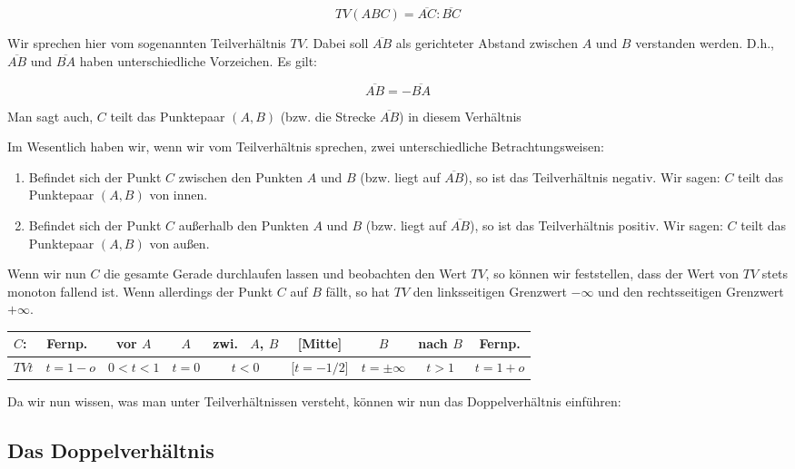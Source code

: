 \documentclass[12pt,a4paper]{article}
\begin{document}
\[TV(A B C) = \overline{A C} : \overline{B C}\]

Wir sprechen hier vom sogenannten Teilverhältnis $TV$. Dabei soll $\overline{A B}$ als gerichteter Abstand zwischen $A$ und $B$ verstanden werden. D.h., $\overline{A B}$ und $\overline{B A}$ haben unterschiedliche Vorzeichen. Es gilt: 

\[\overline{A B} = -\overline{B A}\]

Man sagt auch, $C$ teilt das Punktepaar $(A , B)$ (bzw. die Strecke $\overline{A B}$) in diesem Verhältnis \citep[S.~76]{projektiveGeometrie}

Im Wesentlich haben wir, wenn wir vom Teilverhältnis sprechen, zwei unterschiedliche Betrachtungsweisen:
\begin{enumerate}
\item Befindet sich der Punkt $C$ zwischen den Punkten $A$ und $B$ (bzw. liegt auf $\overline{A B}$), so ist das Teilverhältnis negativ. Wir sagen: $C$ teilt das Punktepaar $(A , B)$ \glqq von innen\grqq .
\item Befindet sich der Punkt $C$ außerhalb den Punkten $A$ und $B$ (bzw. liegt auf $\overline{A B}$), so ist das Teilverhältnis positiv. Wir sagen: $C$ teilt das Punktepaar $(A , B)$ \glqq von außen\grqq .
\end{enumerate}

Wenn wir nun $C$ die gesamte Gerade durchlaufen lassen und beobachten den Wert $TV$, so können wir feststellen, dass der Wert von $TV$ stets monoton fallend ist. Wenn allerdings der Punkt $C$ auf $B$ fällt, so hat $TV$ den linksseitigen Grenzwert $-\infty$ und den rechtsseitigen Grenzwert $+\infty$.
\begin{center}
\begin{scriptsize}
\begin{tabular}[htbp]{l|c|c|c|c|c|c|c|c}
$C$: & Fernp.~ & vor $A$ &  $A$ & zwi.~ $A$, $B$ & [Mitte] & $B$ & nach $B$ & Fernp.\\
\hline
$TV t$ & $t = 1 - o$ & $0 < t < 1$ & $t = 0$ & $t < 0$ & [$t = -1/2$] & $t = \pm\infty$ & $t > 1$ & $t = 1 + o$\\
\end{tabular}
\end{scriptsize}
\end{center}

Da wir nun wissen, was man unter Teilverhältnissen versteht, können wir nun das Doppelverhältnis einführen:

\subsection{Das Doppelverhältnis}
\end{document}
